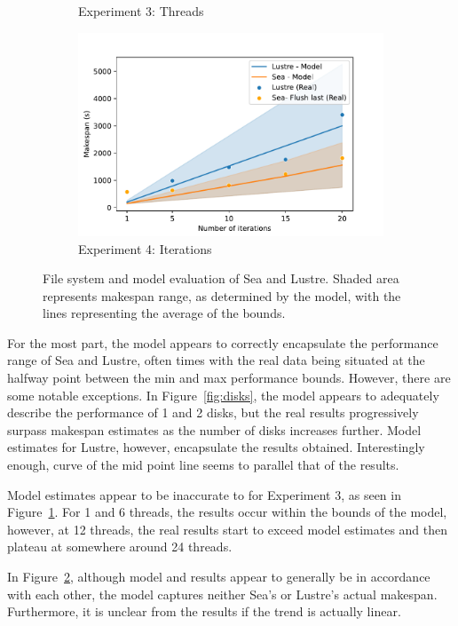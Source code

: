\documentclass{report}
\begin{document}
\begin{figure}
\begin{subfigure}{0.5\textwidth}
            \caption{Experiment 3: Threads}
            \label{fig:threads}
        \end{subfigure}
        \begin{subfigure}{0.5\textwidth}
            \centering
            \includegraphics[width=0.8\linewidth]{figures/iterations.pdf}
            \caption{Experiment 4: Iterations}
            \label{fig:iterations}
        \end{subfigure}
        \caption{File system and model evaluation of Sea and Lustre. Shaded
        area represents makespan range, as determined by the model, with the
        lines representing the average of the bounds.}

    \label{fig:seaexp}
\end{figure}
    For the most part, the model appears to correctly encapsulate the
    performance range of Sea and Lustre, often times with the real data being
    situated at the halfway point between the min and max performance bounds.
    However, there are some notable exceptions.
    In Figure~\ref{fig:disks}, the model appears to adequately describe the
    performance of 1 and 2 disks, but the real results progressively surpass
    makespan estimates as the number of disks increases further. Model estimates
    for Lustre, however, encapsulate the results obtained. Interestingly
    enough, curve of the mid point line seems to parallel that of the results.

    Model estimates appear to be inaccurate to for Experiment 3, as seen in
    Figure~\ref{fig:threads}. For 1 and 6 threads, the results occur within
    the bounds of the model, however, at 12 threads, the real results start
    to exceed model estimates and then plateau at somewhere around 24 threads.

    In Figure~\ref{fig:iterations}, although model and results appear to
    generally be in accordance with each other, the model captures neither
    Sea's or Lustre's actual makespan. Furthermore, it is unclear from the
    results if the trend is actually linear.
\end{document}
